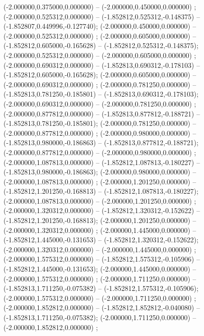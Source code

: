  (-2.000000,0.375000,0.000000) -- (-2.000000,0.450000,0.000000) ;
 (-2.000000,0.525312,0.000000) -- (-1.852812,0.525312,-0.148375) -- (-1.852807,0.449996,-0.127740);
 (-2.000000,0.450000,0.000000) -- (-2.000000,0.525312,0.000000) ;
 (-2.000000,0.605000,0.000000) -- (-1.852812,0.605000,-0.165628) -- (-1.852812,0.525312,-0.148375);
 (-2.000000,0.525312,0.000000) -- (-2.000000,0.605000,0.000000) ;
 (-2.000000,0.690312,0.000000) -- (-1.852813,0.690312,-0.178103) -- (-1.852812,0.605000,-0.165628);
 (-2.000000,0.605000,0.000000) -- (-2.000000,0.690312,0.000000) ;
 (-2.000000,0.781250,0.000000) -- (-1.852813,0.781250,-0.185801) -- (-1.852813,0.690312,-0.178103);
 (-2.000000,0.690312,0.000000) -- (-2.000000,0.781250,0.000000) ;
 (-2.000000,0.877812,0.000000) -- (-1.852813,0.877812,-0.188721) -- (-1.852813,0.781250,-0.185801);
 (-2.000000,0.781250,0.000000) -- (-2.000000,0.877812,0.000000) ;
 (-2.000000,0.980000,0.000000) -- (-1.852813,0.980000,-0.186863) -- (-1.852813,0.877812,-0.188721);
 (-2.000000,0.877812,0.000000) -- (-2.000000,0.980000,0.000000) ;
 (-2.000000,1.087813,0.000000) -- (-1.852812,1.087813,-0.180227) -- (-1.852813,0.980000,-0.186863);
 (-2.000000,0.980000,0.000000) -- (-2.000000,1.087813,0.000000) ;
 (-2.000000,1.201250,0.000000) -- (-1.852812,1.201250,-0.168813) -- (-1.852812,1.087813,-0.180227);
 (-2.000000,1.087813,0.000000) -- (-2.000000,1.201250,0.000000) ;
 (-2.000000,1.320312,0.000000) -- (-1.852812,1.320312,-0.152622) -- (-1.852812,1.201250,-0.168813);
 (-2.000000,1.201250,0.000000) -- (-2.000000,1.320312,0.000000) ;
 (-2.000000,1.445000,0.000000) -- (-1.852812,1.445000,-0.131653) -- (-1.852812,1.320312,-0.152622);
 (-2.000000,1.320312,0.000000) -- (-2.000000,1.445000,0.000000) ;
 (-2.000000,1.575312,0.000000) -- (-1.852812,1.575312,-0.105906) -- (-1.852812,1.445000,-0.131653);
 (-2.000000,1.445000,0.000000) -- (-2.000000,1.575312,0.000000) ;
 (-2.000000,1.711250,0.000000) -- (-1.852813,1.711250,-0.075382) -- (-1.852812,1.575312,-0.105906);
 (-2.000000,1.575312,0.000000) -- (-2.000000,1.711250,0.000000) ;
 (-2.000000,1.852812,0.000000) -- (-1.852812,1.852812,-0.040080) -- (-1.852813,1.711250,-0.075382);
 (-2.000000,1.711250,0.000000) -- (-2.000000,1.852812,0.000000) ;
